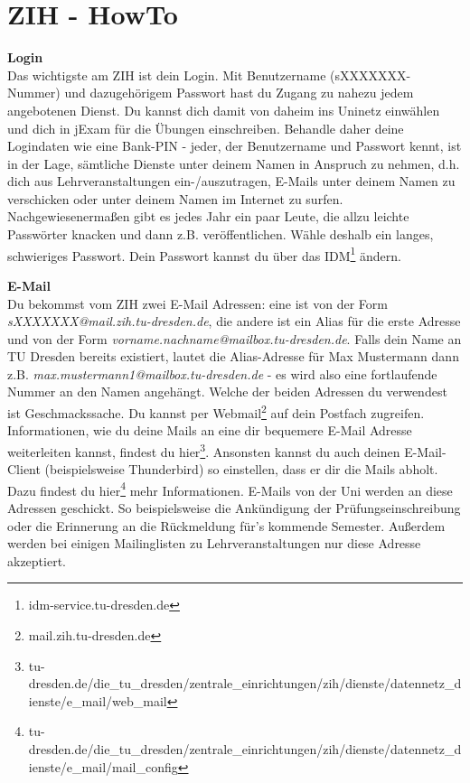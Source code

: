 \section{ZIH - HowTo}


\textbf{Login} \\
Das wichtigste am ZIH ist dein Login.
Mit Benutzername (sXXXXXXX-Nummer) und dazugehörigem Passwort hast du Zugang zu nahezu jedem angebotenen Dienst.
Du kannst dich damit von daheim ins Uninetz einwählen und dich in jExam für die Übungen einschreiben.
Behandle daher deine Logindaten wie eine Bank-PIN - jeder, der Benutzername und Passwort kennt, ist in der Lage, sämtliche Dienste unter deinem Namen in Anspruch zu nehmen, d.h. dich aus Lehrveranstaltungen ein-/auszutragen, E-Mails unter deinem Namen zu verschicken oder unter deinem Namen im Internet zu surfen.
Nachgewiesenermaßen gibt es jedes Jahr ein paar Leute, die allzu leichte Passwörter knacken und dann z.B. veröffentlichen.
Wähle deshalb ein langes, schwieriges Passwort. Dein Passwort kannst du über das IDM\footnote{idm-service.tu-dresden.de} ändern.

\textbf{E-Mail} \\
Du bekommst vom ZIH zwei E-Mail Adressen:
eine ist von der Form \textit{sXXXXXXX@mail.zih.tu-dresden.de}, die andere ist ein Alias für die erste Adresse und von der Form \textit{vorname.nachname@mailbox.tu-dresden.de}.
Falls dein Name an TU Dresden bereits existiert, lautet die Alias-Adresse für Max Mustermann dann z.B. \textit{max.mustermann1@mailbox.tu-dresden.de} - es wird also eine fortlaufende Nummer an den Namen angehängt.
Welche der beiden Adressen du verwendest ist Geschmackssache.
Du kannst per Webmail\footnote{mail.zih.tu-dresden.de} auf dein Postfach zugreifen.
Informationen, wie du deine Mails an eine dir bequemere E-Mail Adresse weiterleiten kannst, findest du hier\footnote{tu-dresden.de/die_tu_dresden/zentrale_einrichtungen/zih/dienste/datennetz_dienste/e_mail/web_mail}.
Ansonsten kannst du auch deinen E-Mail-Client (beispielsweise Thunderbird) so einstellen, dass er dir die Mails abholt.
Dazu findest du hier\footnote{tu-dresden.de/die_tu_dresden/zentrale_einrichtungen/zih/dienste/datennetz_dienste/e_mail/mail_config} mehr Informationen.
E-Mails von der Uni werden an diese Adressen geschickt.
So beispielsweise die Ankündigung der Prüfungseinschreibung oder die Erinnerung an die Rückmeldung für's kommende Semester.
Außerdem werden bei einigen Mailinglisten zu Lehrveranstaltungen nur diese Adresse akzeptiert.

